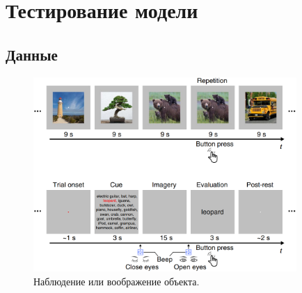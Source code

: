 \documentclass{beamer}
\begin{document}
	\section{Тестирование модели}
		\subsection{Данные}
			\begin{frame}		
				\begin{figure}
					\centering
					\includegraphics[width=10cm]{../images/data_3.png}
					\caption{Наблюдение или воображение объекта.} 
				\end{figure}
			\end{frame}
		
\end{document}
